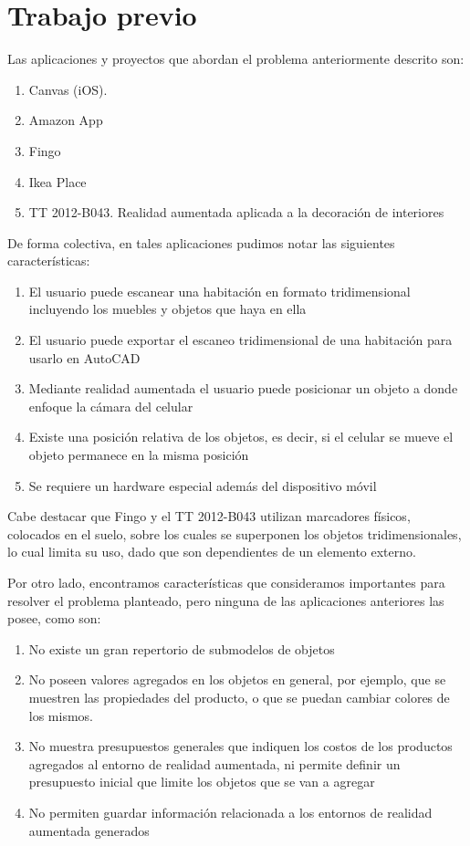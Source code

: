 \section{Trabajo previo}
Las aplicaciones y proyectos que abordan el problema anteriormente descrito son:

\begin{enumerate}
	\item Canvas (iOS).
	\item Amazon App
	\item Fingo
	\item Ikea Place
	\item TT 2012-B043. Realidad aumentada aplicada a la decoración de interiores
\end{enumerate}

De forma colectiva, en tales aplicaciones pudimos notar las siguientes características:

\begin{enumerate}
	\item El usuario puede escanear una habitación en formato tridimensional incluyendo los muebles y objetos que haya en ella
	\item El usuario puede exportar el escaneo tridimensional de una habitación para usarlo en AutoCAD
	\item Mediante realidad aumentada el usuario puede posicionar un objeto a donde enfoque la cámara del celular
	\item Existe una posición relativa de los objetos, es decir, si el celular se mueve el objeto permanece en la misma posición
	\item Se requiere un hardware especial además del dispositivo móvil
\end{enumerate}

Cabe destacar que Fingo y el TT 2012-B043 utilizan marcadores físicos, colocados en el suelo, sobre los cuales se superponen los objetos tridimensionales, lo cual limita su uso, dado que son dependientes de un elemento externo.\par
Por otro lado, encontramos características que consideramos importantes para resolver el problema planteado, pero ninguna de las aplicaciones anteriores las posee, como son:


\begin{enumerate}
	\item No existe un gran repertorio de submodelos de objetos
	\item No poseen valores agregados en los objetos en general, por ejemplo, que se muestren las propiedades del producto, o que se puedan cambiar colores de los mismos.
	\item No muestra presupuestos generales que indiquen los costos de los productos agregados al entorno de realidad aumentada, ni permite definir un presupuesto inicial que limite los objetos que se van a agregar
	\item No permiten guardar información relacionada a los entornos de realidad aumentada generados
\end{enumerate}

